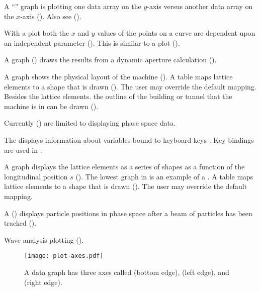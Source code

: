 {{{{{\begin{description}
A ``'' graph is plotting one data array on the $y$-axis versus another data array on
the $x$-axis (). Also see  ().

With a  plot both the $x$ and $y$ values of the points on a curve are dependent
upon an independent parameter (). This is similar to a  plot
().
%
\item["dynamic_aperture"] \Newline
A  graph () draws the results from a dynamic aperture
calculation ().
%
\item["floor_plan"] \Newline
A  graph shows the physical layout of the machine (). A table maps
lattice elements to a shape that is drawn (). The user may override the default
mapping. Besides the lattice elements. the outline of the building or tunnel that the machine is in
can be drawn ().
%
\item["histogram"] \Newline
Currently  () are limited to displaying phase space data.
%
\item["key_table"] \Newline
The  displays information about variables bound to keyboard keys .
Key bindings are used in .
%
\item["lat_layout"] \Newline
A  graph displays the lattice elements as a series of shapes as a function of the
longitudinal position $s$ (). The lowest graph in  is an example
of a .  A table maps lattice elements to a shape that is drawn ().
The user may override the default mapping.
%
\item["phase_space"] \Newline
A  () displays particle positions in phase space after
a beam of particles has been tracked ().
%
\item["wave.0", "wave.a", "wave.b"] \Newline
Wave analysis plotting ().
%
\end{description}

\begin{figure}[b]
  \centering
  \texttt{[image: plot-axes.pdf]}
  \caption[Plot axes.]
{A data graph has three axes called  (bottom edge),  (left edge), and  (right edge).}
  \label{f:plot.axes}
\end{figure}

}}}}}
